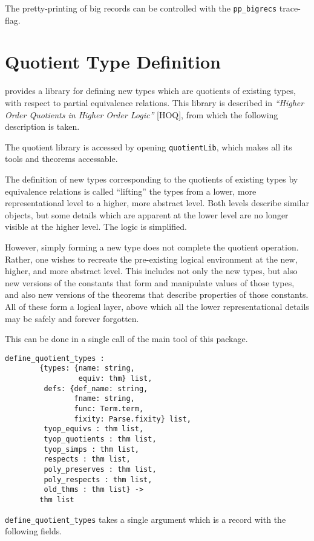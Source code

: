 The pretty-printing of big records can be controlled with the
\texttt{pp\_bigrecs} trace-flag.


\section{Quotient Type Definition}\label{quotients}

\HOL{} provides a library for defining new types which are quotients
of existing types, with respect to partial equivalence relations.
This library is described in {\it ``Higher Order Quotients in Higher
Order Logic''} [HOQ], from which the following description is taken.

The quotient library is accessed by opening {\tt quotientLib},
which makes all its tools and theorems accessable.

The definition of new types corresponding to the quotients of
existing types by equivalence relations is called ``lifting''
the types from a lower, more representational level to a higher,
more abstract level.  Both levels describe similar objects, but
some details which are apparent at the lower level are no longer
visible at the higher level.  The logic is simplified.

However, simply forming a new type does not complete the quotient operation.
Rather, one wishes to recreate the
pre-existing logical environment at the new,
higher, and more abstract level.  This includes not only the new
types, but also new versions of the constants that form and
manipulate values of those types, and also new versions of the
theorems that describe properties of those constants.  All of these
form a logical layer, above which all the lower representational details
may be safely and forever forgotten.

This can be done in a single call of the
main tool of this package.

\begin{hol}
\begin{verbatim}
define_quotient_types :
        {types: {name: string,
                 equiv: thm} list,
         defs: {def_name: string,
                fname: string,
                func: Term.term,
                fixity: Parse.fixity} list,
         tyop_equivs : thm list,
         tyop_quotients : thm list,
         tyop_simps : thm list,
         respects : thm list,
         poly_preserves : thm list,
         poly_respects : thm list,
         old_thms : thm list} ->
        thm list
\end{verbatim}
\end{hol}
{\tt define\_quotient\_types} takes a single argument which is a
record with the following fields.

